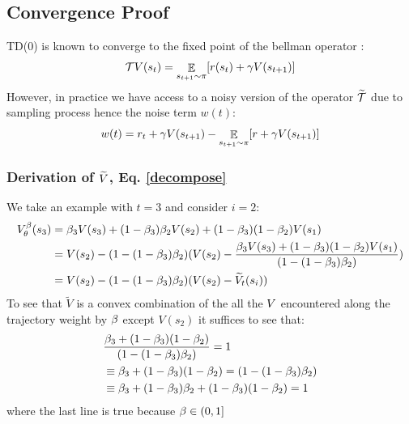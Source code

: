 \subsection{Convergence Proof}
TD(0) is known to converge to the fixed point of the bellman operator \cite{sutton1988learning}:
\begin{equation}
\begin{split}
    \mathcal{T} V(s_t) &= \mathop{\mathbb{E}}_{s_{t+1} \sim \pi} [r(s_t) + \gamma V(s_{t+1})]\\
\end{split}
\end{equation}
However, in practice we have access to a noisy version of the operator $\widetilde{\mathcal{T}}$ due to sampling process hence the noise term $w(t)$:
\begin{equation}
    w(t) = r_t + \gamma V (s_{t+1}) - \mathop{\mathbb{E}}_{s_{t+1} \sim \pi} [r + \gamma V(s_{t+1})]
\end{equation}
\subsubsection{Derivation of $\widetilde{V}$, Eq. \ref{decompose}}\label{decompose_app}
We take an example with $t=3$ and consider $i=2$:
\begin{equation}
    \begin{split}
        V^{\beta}_{\theta}(s_3) &= \beta_3 V(s_3) + (1-\beta_3)\beta_2 V(s_2) + (1-\beta_3)(1-\beta_2)  V(s_1)\\
        &= V(s_2) - (1-(1-\beta_3)\beta_2)(V(s_2) - \frac{\beta_3 V(s_3) + (1-\beta_3)(1-\beta_2)  V(s_1)}{(1-(1-\beta_3)\beta_2)})\\
        &= V(s_2) - (1-(1-\beta_3)\beta_2)(V(s_2) - \widetilde{V}_t(s_i))
    \end{split}
\end{equation}
To see that $\widetilde{V}$ is a convex combination of the all the $V$ encountered along the trajectory weight by $\beta$ except $V(s_2)$ it suffices to see that:
\begin{equation}
    \begin{split}
        & \frac{\beta_3  + (1-\beta_3)(1-\beta_2)  }{(1-(1-\beta_3)\beta_2)} = 1 \\
        &\equiv \beta_3  + (1-\beta_3)(1-\beta_2)  = (1-(1-\beta_3)\beta_2) \\
        &\equiv \beta_3 + (1-\beta_3)\beta_2 + (1-\beta_3)(1-\beta_2) = 1
    \end{split}
\end{equation}
where the last line is true because $\beta \in (0,1]$
